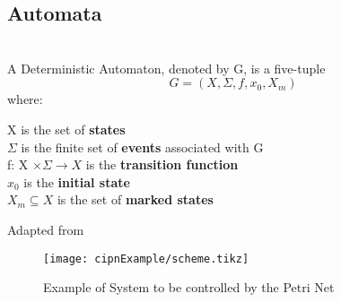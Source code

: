\subsection{Automata}
\label{sec:automata}
\begin{definition}
\label{def:DeterministicAutomaton}~\\  
A Deterministic Automaton, denoted by G, is a five-tuple
\[ G = (X,\Sigma,f, x_0,X_m)\]
where:

\indent X is the set of \textbf{states} \\
\indent $\Sigma$ is the finite set of \textbf{events} associated with G\\
\indent f: X $\times \Sigma \rightarrow X$ is the \textbf{transition function}  \\ 
\indent $x_0$ is the \textbf{initial state} \\
\indent $X_m \subseteq X $ is the set of \textbf{marked states}

\end{definition}


Adapted from \cite{david1989grafcet}
\begin{figure}[H]
  \centering
  \texttt{[image: cipnExample/scheme.tikz]}
  \caption[cipnexample]{Example of System to be controlled by the Petri Net}
  \label{fig:cipnexamplescheme}
\end{figure}

